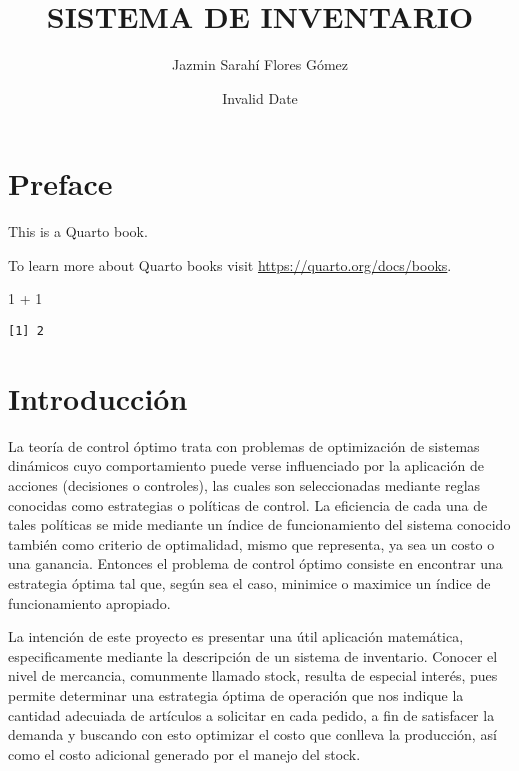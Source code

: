 \documentclass[
  letterpaper,
  DIV=11,
  numbers=noendperiod]{scrreprt}
\title{SISTEMA DE INVENTARIO}
\author{Jazmin Sarahí Flores Gómez}
\date{Invalid Date}
\newenvironment{Shaded}{\begin{snugshade}}{\end{snugshade}}
\newcommand{\DecValTok}[1]{\textcolor[rgb]{0.68,0.00,0.00}{#1}}
\newcommand{\SpecialCharTok}[1]{\textcolor[rgb]{0.37,0.37,0.37}{#1}}
\renewcommand*\contentsname{Table of contents}
\newcommand\contentsname{Table of contents}
\begin{document}
\maketitle

\renewcommand*\contentsname{Table of contents}
{
\hypersetup{linkcolor=}
\setcounter{tocdepth}{2}
\tableofcontents
}


\chapter*{Preface}\label{preface}


This is a Quarto book.

To learn more about Quarto books visit
\url{https://quarto.org/docs/books}.

\begin{Shaded}
\begin{Highlighting}[]
\DecValTok{1} \SpecialCharTok{+} \DecValTok{1}
\end{Highlighting}
\end{Shaded}

\begin{verbatim}
[1] 2
\end{verbatim}


\chapter{Introducción}\label{introducciuxf3n}

La teoría de control óptimo trata con problemas de optimización de
sistemas dinámicos cuyo comportamiento puede verse influenciado por la
aplicación de acciones (decisiones o controles), las cuales son
seleccionadas mediante reglas conocidas como estrategias o políticas de
control. La eficiencia de cada una de tales políticas se mide mediante
un índice de funcionamiento del sistema conocido también como criterio
de optimalidad, mismo que representa, ya sea un costo o una ganancia.
Entonces el problema de control óptimo consiste en encontrar una
estrategia óptima tal que, según sea el caso, minimice o maximice un
índice de funcionamiento apropiado.

La intención de este proyecto es presentar una útil aplicación
matemática, especificamente mediante la descripción de un sistema de
inventario. Conocer el nivel de mercancia, comunmente llamado stock,
resulta de especial interés, pues permite determinar una estrategia
óptima de operación que nos indique la cantidad adecuiada de artículos a
solicitar en cada pedido, a fin de satisfacer la demanda y buscando con
esto optimizar el costo que conlleva la producción, así como el costo
adicional generado por el manejo del stock.
\end{document}
